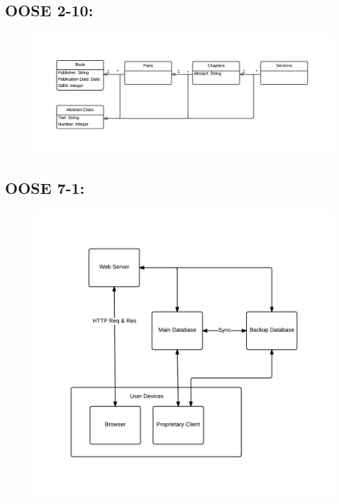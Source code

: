 \documentclass[11pt,a4paper]{article}
\begin{document}
\subsection{OOSE 2-10:}

\begin{figure}[h!]
    \centering
    \includegraphics[width=1.1\textwidth]{pictures/oose2_10}

    \label{fig:OOSE210}
\end{figure}

\newpage
\subsection{OOSE 7-1:}

\begin{figure}[h!]
    \centering
    \includegraphics[width=1.1\textwidth]{pictures/oose7_1}
    \label{fig:OOSE71}
\end{figure}
\end{document}
